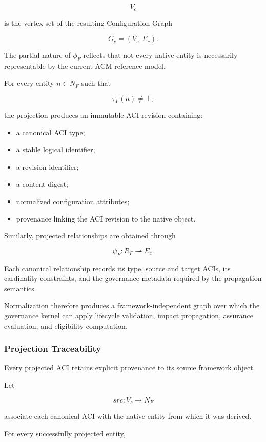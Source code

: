 \documentclass[10pt]{article}
\begin{document}
\[
V_c
\]

is the vertex set of the resulting Configuration Graph

\[
G_c=(V_c,E_c).
\]

The partial nature of $\phi_F$ reflects that not every native entity is
necessarily representable by the current ACM reference model.

For every entity $n\in N_F$ such that

\[
\tau_F(n)\neq\bot,
\]

the projection produces an immutable ACI revision containing:

\begin{itemize}
	\item a canonical ACI type;
	\item a stable logical identifier;
	\item a revision identifier;
	\item a content digest;
	\item normalized configuration attributes;
	\item provenance linking the ACI revision to the native object.
\end{itemize}

Similarly, projected relationships are obtained through

\[
\psi_F :
R_F
\rightharpoonup
E_c.
\tag{43}
\]

Each canonical relationship records its type, source and target ACIs, its
cardinality constraints, and the governance metadata required by the
propagation semantics.

Normalization therefore produces a framework-independent graph over which the
governance kernel can apply lifecycle validation, impact propagation, assurance
evaluation, and eligibility computation.

\subsubsection{Projection Traceability}

Every projected ACI retains explicit provenance to its source framework object.

Let

\[
src :
V_c
\rightarrow
N_F
\tag{44}
\]

associate each canonical ACI with the native entity from which it was derived.

For every successfully projected entity,
\end{document}

